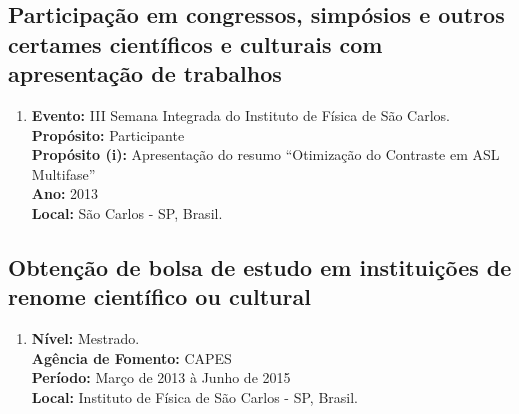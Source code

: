 \documentclass[a4paper,oneside,10pt]{article}
\begin{document}

\subsection{\large{Participação  em  congressos,  simpósios  e  outros  certames  científicos  e  culturais  com apresentação  de  trabalhos}}
\vspace{0.3cm}

\begin{enumerate}
\renewcommand{\labelenumi}{{\large\bfseries\arabic{enumi}.}}

\item   \textbf{Evento:} III Semana Integrada do Instituto de Física de São Carlos. \mbox{} \\
        \textbf{Propósito:} Participante\\
        \textbf{Propósito (i):} Apresentação do resumo ``Otimização do Contraste em ASL Multifase''\\
        \textbf{Ano:} 2013\\
        \textbf{Local:} São Carlos - SP, Brasil.

\end{enumerate}


\subsection{\large{Obtenção  de  bolsa  de  estudo  em  instituições de  renome  científico  ou  cultural}}
\vspace{0.3cm}

\begin{enumerate}
\renewcommand{\labelenumi}{{\large\bfseries\arabic{enumi}.}}

\item   \textbf{Nível:} Mestrado. \mbox{} \\
        \textbf{Agência de Fomento:} CAPES\\
        \textbf{Período:} Março de 2013 à Junho de 2015\\
        \textbf{Local:} Instituto de Física de São Carlos - SP, Brasil.

\end{enumerate}
\end{document}
